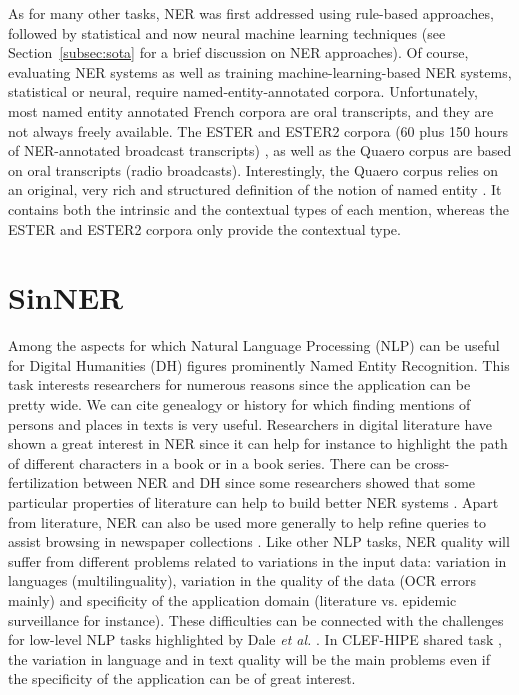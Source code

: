 As for many other tasks, NER was first addressed using rule-based approaches, followed by statistical and now neural machine learning techniques (see Section~\ref{subsec:sota} for a brief discussion on NER approaches). Of course, evaluating NER systems as well as training machine-learning-based NER systems, statistical or neural, require named-entity-annotated corpora.
Unfortunately, most named entity annotated French corpora are oral transcripts, and they are not always freely available. The ESTER and ESTER2 corpora (60 plus 150 hours of NER-annotated broadcast transcripts)
\cite{galliano-etal-2005-the,galliano-etal-2009-the}, as well as the Quaero
\cite{grouin-etal-2011-proposal} corpus are based on oral transcripts (radio broadcasts). Interestingly, the Quaero corpus relies on an original, very rich and structured  definition of the notion of named entity \cite{rosset-etal-2011-entites}. It contains both the intrinsic and the contextual types of each mention, whereas the ESTER and ESTER2 corpora only provide the contextual type.

\section{SinNER}

Among the aspects for which Natural Language Processing (NLP) can be useful for Digital Humanities (DH) figures prominently Named Entity Recognition. This task interests researchers for numerous reasons since the application can be pretty wide.
We can cite genealogy or history for which finding mentions of persons and places in texts is very useful. Researchers in digital literature have shown a great interest in NER since it can help for instance to highlight the path of different characters in a book or in a book series. There can be cross-fertilization between NER and DH since some researchers showed that some particular properties of literature can help to build better NER systems \cite{brooke-etal-2016-bootstrapped}.
Apart from literature, NER can also be used more generally to help refine queries to assist browsing in newspaper collections \cite{neudecker-etal-2014-large}.
Like other NLP tasks, NER quality will suffer from different problems related to variations in the input data: variation in languages (multilinguality), variation in the quality of the data (OCR errors mainly) and specificity of the application domain (literature vs. epidemic surveillance for instance). These difficulties can be connected with the challenges for low-level NLP tasks highlighted by Dale \textit{et al.} \cite{dale-etal-2000-handbook}. In CLEF-HIPE shared task \cite{ehrmann-etal-2020-extended}, the variation in language and in text quality will be the main problems even if the specificity of the application can be of great interest.

